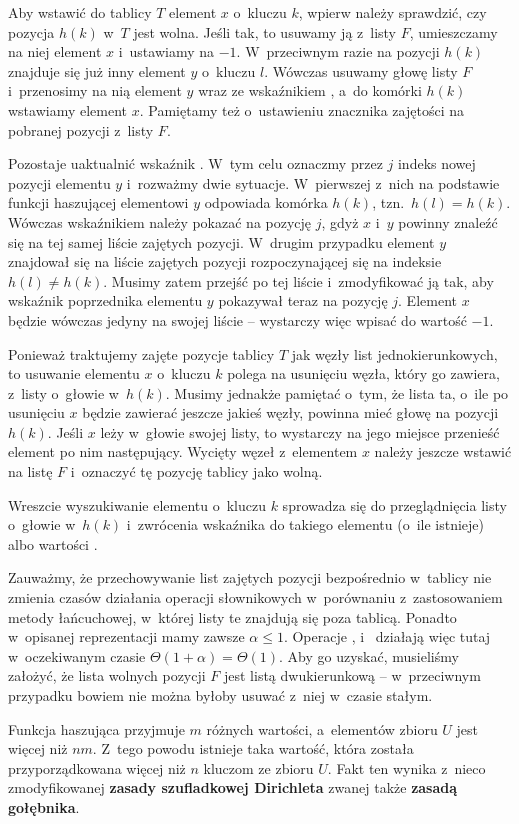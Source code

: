 Aby wstawić do tablicy $T$ element $x$ o~kluczu $k$, wpierw należy sprawdzić, czy pozycja $h(k)$ w~$T$ jest wolna.
Jeśli tak, to usuwamy ją z~listy $F$, umieszczamy na niej element $x$ i~ustawiamy  na $-1$.
W~przeciwnym razie na pozycji $h(k)$ znajduje się już inny element $y$ o~kluczu $l$.
Wówczas usuwamy głowę listy $F$ i~przenosimy na nią element $y$ wraz ze wskaźnikiem , a~do komórki $h(k)$ wstawiamy element $x$.
Pamiętamy też o~ustawieniu znacznika zajętości na pobranej pozycji z~listy $F$.

Pozostaje uaktualnić wskaźnik .
W~tym celu oznaczmy przez $j$ indeks nowej pozycji elementu $y$ i~rozważmy dwie sytuacje.
W~pierwszej z~nich na podstawie funkcji haszującej elementowi $y$ odpowiada komórka $h(k)$, tzn.\ $h(l)=h(k)$.
Wówczas wskaźnikiem  należy pokazać na pozycję $j$, gdyż $x$ i~$y$ powinny znaleźć się na tej samej liście zajętych pozycji.
W~drugim przypadku element $y$ znajdował się na liście zajętych pozycji rozpoczynającej się na indeksie $h(l)\ne h(k)$.
Musimy zatem przejść po tej liście i~zmodyfikować ją tak, aby wskaźnik  poprzednika elementu $y$ pokazywał teraz na pozycję $j$.
Element $x$ będzie wówczas jedyny na swojej liście -- wystarczy więc wpisać do  wartość $-1$.

Ponieważ traktujemy zajęte pozycje tablicy $T$ jak węzły list jednokierunkowych, to usuwanie elementu $x$ o~kluczu $k$ polega na usunięciu węzła, który go zawiera, z~listy o~głowie w~$h(k)$.
Musimy jednakże pamiętać o~tym, że lista ta, o~ile po usunięciu $x$ będzie zawierać jeszcze jakieś węzły, powinna mieć głowę na pozycji $h(k)$.
Jeśli $x$ leży w~głowie swojej listy, to wystarczy na jego miejsce przenieść element po nim następujący.
Wycięty węzeł z~elementem $x$ należy jeszcze wstawić na listę $F$ i~oznaczyć tę pozycję tablicy jako wolną.

Wreszcie wyszukiwanie elementu o~kluczu $k$ sprowadza się do przeglądnięcia listy o~głowie w~$h(k)$ i~zwrócenia wskaźnika do takiego elementu (o~ile istnieje) albo wartości .

Zauważmy, że przechowywanie list zajętych pozycji bezpośrednio w~tablicy nie zmienia czasów działania operacji słownikowych w~porównaniu z~zastosowaniem metody łańcuchowej, w~której listy te znajdują się poza tablicą.
Ponadto w~opisanej reprezentacji mamy zawsze $\alpha\le1$.
Operacje ,  i~ działają więc tutaj w~oczekiwanym czasie $\Theta(1+\alpha)=\Theta(1)$.
Aby go uzyskać, musieliśmy założyć, że lista wolnych pozycji $F$ jest listą dwukierunkową -- w~przeciwnym przypadku bowiem nie można byłoby usuwać z~niej w~czasie stałym.

\exercise %
Funkcja haszująca przyjmuje $m$ różnych wartości, a~elementów zbioru $U$ jest więcej niż $nm$.
Z~tego powodu istnieje taka wartość, która została przyporządkowana więcej niż $n$ kluczom ze zbioru $U$.
Fakt ten wynika z~nieco zmodyfikowanej \textbf{zasady szufladkowej Dirichleta} \cite{pigeonholeprinciple} zwanej także \textbf{zasadą gołębnika}.
